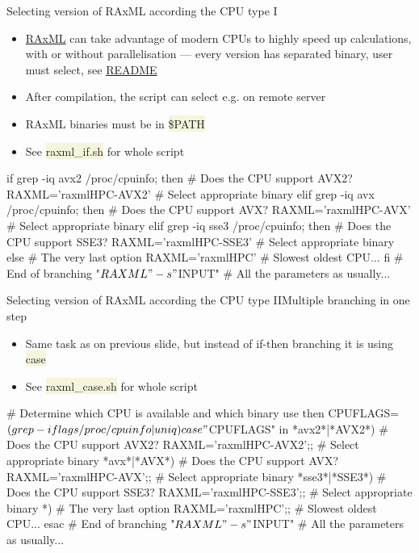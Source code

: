 \documentclass[compress, ucs, xelatex, 11pt, xcolor=svgnames, aspectratio=169,
	hyperref={
		bookmarks=true,
		unicode=true,
		colorlinks=true,
		pdftitle={Linux, command line and MetaCentrum},
		plainpages=false,
		pdfauthor={Vojtech Zeisek},
		pdfsubject={Course about use of Linux command line, writing shell scripts and using MetaCentrum of CESNET},
		pdfcreator={XeLaTeX},
		pdfkeywords={Linux, GNU, BASH, shell, command line, MetaCentrum},
		linkcolor=DarkRed, %
		anchorcolor=DarkBlue, %
		citecolor=Indigo, %
		filecolor=NavyBlue, %
		menucolor=DarkMagenta, %
		urlcolor=DarkBlue, %
		pdftex},
	url={hyphens, lowtilde} %
	]{beamer}
\renewcommand{\texttt}[1]{\colorbox{Beige}{{\ttfamily #1}}}
\begin{document}
\begin{frame}[fragile]{Selecting version of RAxML according the CPU type I}
	\begin{itemize}
		\item \href{https://github.com/stamatak/standard-RAxML}{RAxML} can take advantage of modern CPUs to highly speed up calculations, with or without parallelisation --- every version has separated binary, user must select, see \href{https://github.com/stamatak/standard-RAxML/blob/master/README}{README}
		\item After compilation, the script can select e.g. on remote server
		\item RAxML binaries must be in \texttt{\$PATH}
		\item See \texttt{raxml\_if.sh} for whole script
	\end{itemize}
	\vfill
	\begin{bashcode}
    if grep -iq avx2 /proc/cpuinfo; then # Does the CPU support AVX2?
      RAXML='raxmlHPC-AVX2' # Select appropriate binary
      elif grep -iq avx /proc/cpuinfo; then # Does the CPU support AVX?
        RAXML='raxmlHPC-AVX' # Select appropriate binary
        elif grep -iq sse3 /proc/cpuinfo; then # Does the CPU support SSE3?
          RAXML='raxmlHPC-SSE3' # Select appropriate binary
          else # The very last option
            RAXML='raxmlHPC' # Slowest oldest CPU...
      fi # End of branching
    "$RAXML" -s "$INPUT" # All the parameters as usually...
	\end{bashcode}
\end{frame}

\begin{frame}[fragile]{Selecting version of RAxML according the CPU type II}{Multiple branching in one step}
	\begin{itemize}
		\item Same task as on previous slide, but instead of if-then branching it is using \texttt{case}
		\item See \texttt{raxml\_case.sh} for whole script
	\end{itemize}
	\vfill
	\begin{bashcode}
    # Determine which CPU is available and which binary use then
    CPUFLAGS=$(grep -i flags /proc/cpuinfo | uniq)
    case "$CPUFLAGS" in
      *avx2*|*AVX2*) # Does the CPU support AVX2?
        RAXML='raxmlHPC-AVX2';; # Select appropriate binary
      *avx*|*AVX*) # Does the CPU support AVX?
        RAXML='raxmlHPC-AVX';; # Select appropriate binary
      *sse3*|*SSE3*) # Does the CPU support SSE3?
        RAXML='raxmlHPC-SSE3';; # Select appropriate binary
      *) # The very last option
        RAXML='raxmlHPC';; # Slowest oldest CPU...
      esac # End of branching
    "$RAXML" -s "$INPUT" # All the parameters as usually...
	\end{bashcode}
\end{frame}
\end{document}
